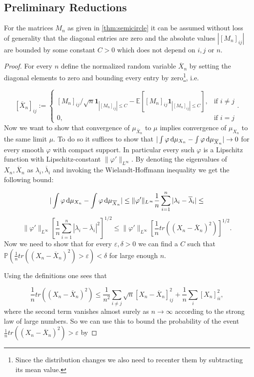 \subsection{Preliminary Reductions}\label{ssec:prelimreduct}
\begin{lemma}
	For the matrices $M_n$ as given in \ref{thm:semicircle} it can be assumed without loss of generality that the diagonal entries are zero and the absolute values $|[M_n]_{ij}|$ are bounded by some constant $C>0$ which does not depend on $i,j$ or $n$.
\end{lemma}
\begin{proof}
	For every $n$ define the normalized random variable $\overline X_n$ by setting the diagonal elements to zero and bounding every entry by zero\footnote{Since the distribution changes we also need to recenter them by subtracting its mean value.}, i.e.

	$$[\overline X_n]_{ij}:=\begin{cases}
						[M_n]_{ij}/\sqrt n\mathbf 1_{|[M_n]_{ij}|\leq C}-\mathbb E\left[[M_n]_{ij}\mathbf 1_{|[M_n]_{ij}|\leq C}\right], &\mbox{if } i\neq j \\
						0, &\mbox{if } i=j
					  \end{cases}.$$
	Now we want to show that convergence of $\mu_{\overline X_n}$ to $\mu$ implies convergence of $\mu_{X_n}$ to the same limit $\mu$. To do so it suffices to show that $|\int\varphi\mathop{}\!\mathrm{d}\mu_{X_n}-\int\varphi\mathop{}\!\mathrm{d}\mu_{\overline X_n}|\rightarrow 0$ for every smooth $\varphi$ with compact support. In particular every such $\varphi$ is a Lipschitz function with Lipschitz-constant $\|\varphi'\|_{L^\infty}$. By denoting the eigenvalues of $X_n,\overline X_n$ as $\lambda_i,\overline\lambda_i$ and invoking the Wielandt-Hoffmann inequality we get the following bound:
	
	$$|\int\varphi\mathop{}\!\mathrm{d}\mu_{X_n}-\int\varphi\mathop{}\!\mathrm{d}\mu_{\overline X_n}| \leq
	\|\varphi'\|_{L^\infty}\frac{1}{n}\sum_{i=1}^n|\lambda_i-\overline\lambda_i| \leq$$
	$$
	\|\varphi'\|_{L^\infty}\left[\frac{1}{n}\sum_{i=1}^n|\lambda_i-\overline\lambda_i|^2\right]^{1/2} \leq
	\|\varphi'\|_{L^\infty}\left[\frac{1}{n}tr\left((X_n-\overline X_n)^2\right)\right]^{1/2}.$$
	Now we need to show that for every $\varepsilon,\delta > 0$ we can find a $C$ such that $\mathbb P\left(\frac{1}{n}tr\left((X_n-\overline X_n)^2\right)>\varepsilon\right)<\delta$ for large enough $n$.
	
	Using the definitions one sees that
	
	$$\frac{1}{n}tr\left((X_n-\overline X_n)^2\right) \leq
	\frac{1}{n^2}\sum_{i\neq j}\sqrt n\left[X_n-\overline X_n\right]_{ij}^2+\frac{1}{n}\sum_i [X_n]_{ii}^2,$$
	where the second term vanishes almost surely as $n\rightarrow\infty$ according to the strong law of large numbers. So we can use this to bound the probability of the event $\frac{1}{n}tr\left((X_n-\overline X_n)^2\right)>\varepsilon$ by
	

\end{proof}
